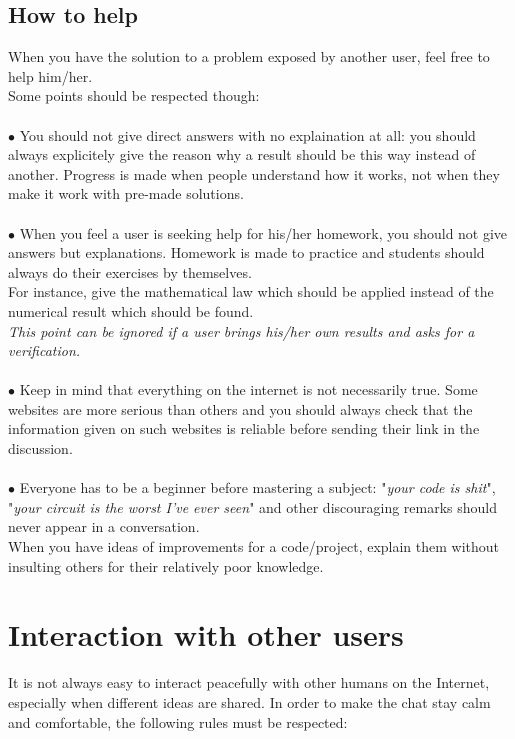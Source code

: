 \documentclass[a4paper]{article}
\begin{document}
\subsection{How to help}
When you have the solution to a problem exposed by another user, feel free to help him/her.\\
Some points should be respected though:\\\\
$\bullet$ You should not give direct answers with no explaination at all: you should always explicitely give the reason why a result should be this way instead of another. Progress is made when people understand how it works, not when they make it work with pre-made solutions.\\\\
$\bullet$ When you feel a user is seeking help for his/her homework, you should not give answers but explanations. Homework is made to practice and students should always do their exercises by themselves.\\
For instance, give the mathematical law which should be applied instead of the numerical result which should be found.\\ \textsl{This point can be ignored if a user brings his/her own results and asks for a verification.}\\\\
$\bullet$ Keep in mind that everything on the internet is not necessarily true. Some websites are more serious than others and you should always check that the information given on such websites is reliable before sending their link in the discussion.\\\\
$\bullet$ Everyone has to be a beginner before mastering a subject: "\textsl{your code is shit}", "\textsl{your circuit is the worst I've ever seen}" and other discouraging remarks should never appear in a conversation.\\
When you have ideas of improvements for a code/project, explain them without insulting others for their relatively poor knowledge.
\pagebreak

\section{Interaction with other users}
It is not always easy to interact peacefully with other humans on the Internet, especially when different ideas are shared. In order to make the chat stay calm and comfortable, the following rules must be respected:
\end{document}
